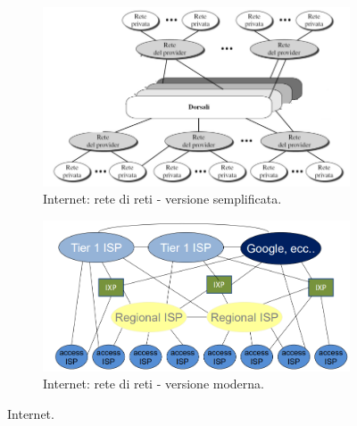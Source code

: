 \documentclass[11pt, italian, openany]{book}
\begin{document}
\begin{sloppypar}
\begin{figure}[h!]
	\begin{subfigure}[t]{0.49 \linewidth} \centering
		\includegraphics[scale=0.28]{images/internet-semplificata.png}
		\caption{Internet: rete di reti - versione semplificata.}
	\end{subfigure}
	\begin{subfigure}[t]{0.49 \linewidth} \centering
		\includegraphics[scale=0.28]{images/internet-completa.png}
		\caption{Internet: rete di reti - versione moderna.}
	\end{subfigure}
	\caption{Internet.}
	\label{fig:internet}
\end{figure}

\pagebreak


\end{sloppypar}
\end{document}
